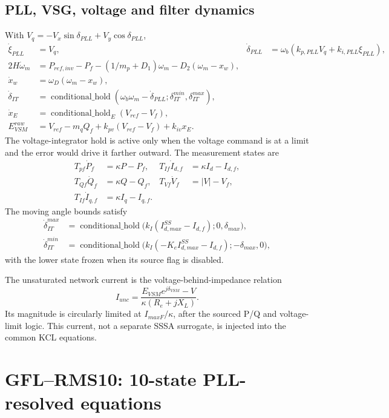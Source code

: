 \documentclass[12pt,a4paper]{article}
\newcommand{\hold}{\operatorname{conditional\_hold}}
\begin{document}
\subsection{PLL, VSG, voltage and filter dynamics}

With \(V_q=-V_x\sin\delta_{PLL}+V_y\cos\delta_{PLL}\),
\begin{align}
\dot\xi_{PLL}&=V_q,&
\dot\delta_{PLL}&=\omega_b(k_{p,PLL}V_q+k_{i,PLL}\xi_{PLL}),\\
2H\dot\omega_m&=P_{ref,inv}-P_f-(1/m_p+D_1)\omega_m-D_2(\omega_m-x_w),\\
\dot x_w&=\omega_D(\omega_m-x_w),\\
\dot\delta_{IT}&=\hold\!\left(\omega_b\omega_m-\dot\delta_{PLL};
\delta_{IT}^{min},\delta_{IT}^{max}\right),\\
\dot x_E&=\hold_E(V_{ref}-V_f),\\
E_{VSM}^{raw}&=V_{ref}-m_qQ_f+k_{pv}(V_{ref}-V_f)+k_{iv}x_E.
\end{align}
The voltage-integrator hold is active only when the voltage command is at a
limit and the error would drive it farther outward.  The measurement states are
\begin{align}
T_{pf}\dot P_f&=\kappa P-P_f,&T_{If}\dot I_{d,f}&=\kappa I_d-I_{d,f},\\
T_{Qf}\dot Q_f&=\kappa Q-Q_f,&T_{Vf}\dot V_f&=|V|-V_f,\\
T_{If}\dot I_{q,f}&=\kappa I_q-I_{q,f}.
\end{align}
The moving angle bounds satisfy
\begin{align}
\dot\delta_{IT}^{max}&=\hold\bigl(k_I(I_{d,max}^{SS}-I_{d,f});0,\delta_{max}\bigr),\\
\dot\delta_{IT}^{min}&=\hold\bigl(k_I(-K_eI_{d,max}^{SS}-I_{d,f});-\delta_{max},0\bigr),
\end{align}
with the lower state frozen when its source flag is disabled.

The unsaturated network current is the voltage-behind-impedance relation
\[
I_{unc}=\frac{E_{VSM}e^{j\delta_{VSM}}-V}{\kappa(R_e+jX_L)}.
\]
Its magnitude is circularly limited at \(I_{maxF}/\kappa\), after the sourced
P/Q and voltage-limit logic.  This current, not a separate SSSA surrogate, is
injected into the common KCL equations.

\section{GFL--RMS10: 10-state PLL-resolved equations}
\end{document}
